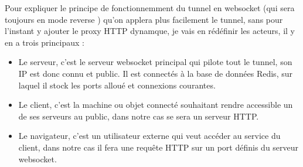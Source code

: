 Pour expliquer le principe de fonctionnemment du tunnel en websocket (qui sera toujours en mode \og reverse \fg{}) qu'on applera plus facilement le tunnel, sans pour l'instant y ajouter le proxy HTTP dynamque, je vais en rédéfinir les acteurs, il y en a trois principaux :
\begin{itemize}
    \item Le serveur, c'est le serveur websocket principal qui pilote tout le tunnel, son IP est donc connu et public. Il est connectés à la base de données Redis, sur laquel il stock les ports alloué et connexions courantes.
    \item Le client, c'est la machine ou objet connecté souhaitant rendre accessible un de ses serveurs au public, dans notre cas se sera un serveur HTTP.
    \item Le navigateur, c'est un utilisateur externe qui veut accéder au service du client, dans notre cas il fera une requête HTTP sur un port définis du serveur websocket. 
\end{itemize}

